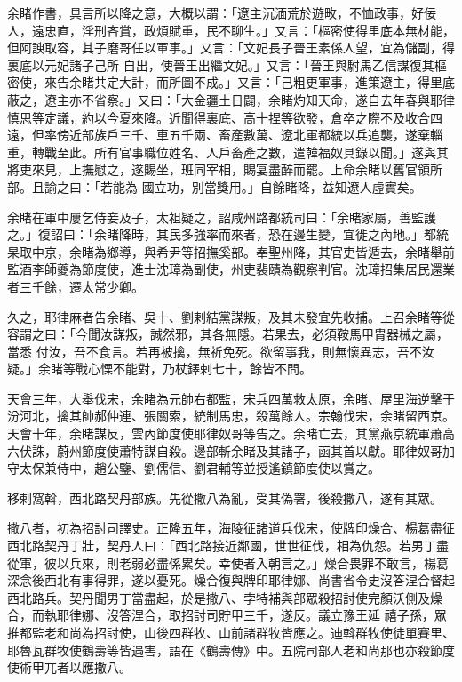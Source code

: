 \begin{pinyinscope}
 余睹作書，具言所以降之意，大概以謂：「遼主沉湎荒於遊畋，不恤政事，好佞人，遠忠直，淫刑吝賞，政煩賦重，民不聊生。」又言：「樞密使得里底本無材能，但阿諛取容，其子磨哥任以軍事。」又言：「文妃長子晉王素係人望，宜為儲副，得裏底以元妃諸子己所
 自出，使晉王出繼文妃。」又言：「晉王與駙馬乙信謀復其樞密使，來告余睹共定大計，而所圖不成。」又言：「己粗更軍事，進策遼主，得里底蔽之，遼主亦不省察。」又曰：「大金疆土日闢，余睹灼知天命，遂自去年春與耶律慎思等定議，約以今夏來降。近聞得裏底、高十捏等欲發，倉卒之際不及收合四遠，但率傍近部族戶三千、車五千兩、畜產數萬、遼北軍都統以兵追襲，遂棄輜重，轉戰至此。所有官事職位姓名、人戶畜產之數，遣韓福奴具錄以聞。」遂與其將吏來見，上撫慰之，遂賜坐，班同宰相，賜宴盡醉而罷。上命余睹以舊官領所部。且諭之曰：「若能為
 國立功，別當獎用。」自餘睹降，益知遼人虛實矣。



 余睹在軍中屢乞侍妾及子，太祖疑之，詔咸州路都統司曰：「余睹家屬，善監護之。」復詔曰：「余睹降時，其民多強率而來者，恐在邊生變，宜徙之內地。」都統杲取中京，余睹為鄉導，與希尹等招撫奚部。奉聖州降，其官吏皆遁去，余睹舉前監酒李師夔為節度使，進士沈璋為副使，州吏裴賾為觀察判官。沈璋招集居民還業者三千餘，遷太常少卿。



 久之，耶律麻者告余睹、吳十、劉剌結黨謀叛，及其未發宜先收捕。上召余睹等從容謂之曰：「今聞汝謀叛，誠然邪，其各無隱。若果去，必須鞍馬甲胄器械之屬，當悉
 付汝，吾不食言。若再被擒，無祈免死。欲留事我，則無懷異志，吾不汝疑。」余睹等戰心慄不能對，乃杖鐸剌七十，餘皆不問。



 天會三年，大舉伐宋，余睹為元帥右都監，宋兵四萬救太原，余睹、屋里海逆擊于汾河北，擒其帥郝仲連、張關索，統制馬忠，殺萬餘人。宗翰伐宋，余睹留西京。天會十年，余睹謀反，雲內節度使耶律奴哥等告之。余睹亡去，其黨燕京統軍蕭高六伏誅，蔚州節度使蕭特謀自殺。邊部斬余睹及其諸子，函其首以獻。耶律奴哥加守太保兼侍中，趙公鑒、劉儒信、劉君輔等並授遙鎮節度使以賞之。



 移剌窩斡，西北路契丹部族。先從撒八為亂，受其偽署，後殺撒八，遂有其眾。



 撒八者，初為招討司譯史。正隆五年，海陵征諸道兵伐宋，使牌印燥合、楊葛盡征西北路契丹丁壯，契丹人曰：「西北路接近鄰國，世世征伐，相為仇怨。若男丁盡從軍，彼以兵來，則老弱必盡係累矣。幸使者入朝言之。」燥合畏罪不敢言，楊葛深念後西北有事得罪，遂以憂死。燥合復與牌印耶律娜、尚書省令史沒答涅合督起西北路兵。契丹聞男丁當盡起，於是撒八、孛特補與部眾殺招討使完顏沃側及燥合，而執耶律娜、沒答涅合，取招討司貯甲三千，遂反。議立豫王延
 禧子孫，眾推都監老和尚為招討使，山後四群牧、山前諸群牧皆應之。迪斡群牧使徒單賽里、耶魯瓦群牧使鶴壽等皆遇害，語在《鶴壽傳》中。五院司部人老和尚那也亦殺節度使術甲兀者以應撒八。




\end{pinyinscope}
